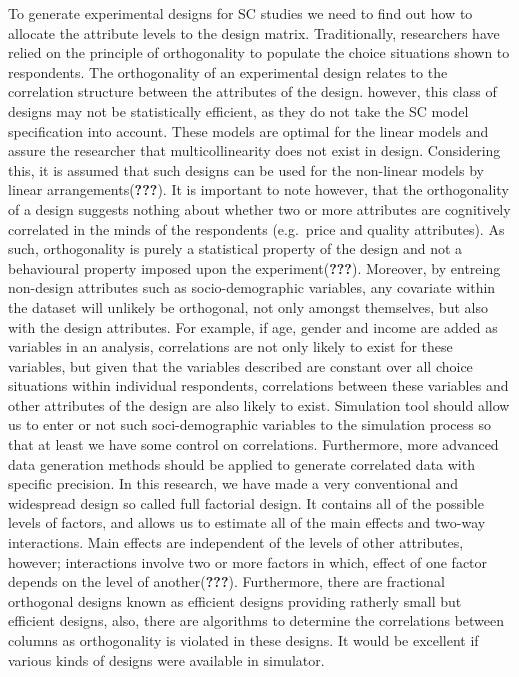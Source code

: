 \documentclass[11pt,]{article}
\begin{document}
To generate experimental designs for SC studies we need to find out how
to allocate the attribute levels to the design matrix. Traditionally,
researchers have relied on the principle of orthogonality to populate
the choice situations shown to respondents. The orthogonality of an
experimental design relates to the correlation structure between the
attributes of the design. however, this class of designs may not be
statistically efficient, as they do not take the SC model specification
into account. These models are optimal for the linear models and assure
the researcher that multicollinearity does not exist in design.
Considering this, it is assumed that such designs can be used for the
non-linear models by linear arrangements({\textbf{???}}). It is
important to note however, that the orthogonality of a design suggests
nothing about whether two or more attributes are cognitively correlated
in the minds of the respondents (e.g.~price and quality attributes). As
such, orthogonality is purely a statistical property of the design and
not a behavioural property imposed upon the experiment({\textbf{???}}).
Moreover, by entreing non-design attributes such as socio-demographic
variables, any covariate within the dataset will unlikely be orthogonal,
not only amongst themselves, but also with the design attributes. For
example, if age, gender and income are added as variables in an
analysis, correlations are not only likely to exist for these variables,
but given that the variables described are constant over all choice
situations within individual respondents, correlations between these
variables and other attributes of the design are also likely to exist.
Simulation tool should allow us to enter or not such soci-demographic
variables to the simulation process so that at least we have some
control on correlations. Furthermore, more advanced data generation
methods should be applied to generate correlated data with specific
precision. In this research, we have made a very conventional and
widespread design so called full factorial design. It contains all of
the possible levels of factors, and allows us to estimate all of the
main effects and two-way interactions. Main effects are independent of
the levels of other attributes, however; interactions involve two or
more factors in which, effect of one factor depends on the level of
another({\textbf{???}}). Furthermore, there are fractional orthogonal
designs known as efficient designs providing ratherly small but
efficient designs, also, there are algorithms to determine the
correlations between columns as orthogonality is violated in these
designs. It would be excellent if various kinds of designs were
available in simulator.
\end{document}
